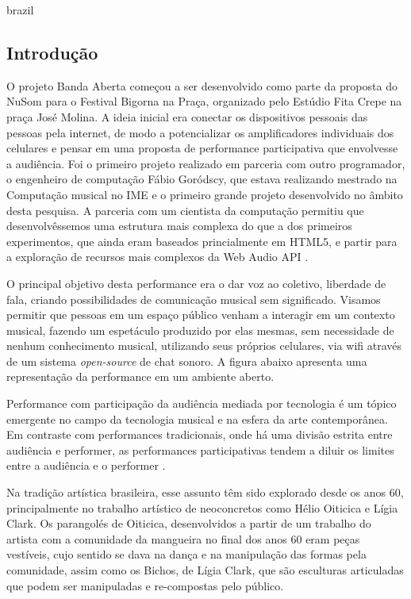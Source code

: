 \begin{otherlanguage*}{brazil}
\subsection{Introdução}
O projeto Banda Aberta começou a ser desenvolvido como parte da proposta do NuSom para o Festival Bigorna na Praça, organizado pelo Estúdio Fita Crepe na praça José Molina. A ideia inicial era conectar os dispositivos pessoais das pessoas pela internet, de modo a potencializar os amplificadores individuais dos celulares e pensar em uma proposta de performance participativa que envolvesse a audiência. Foi o primeiro projeto realizado em parceria com outro programador, o engenheiro de computação Fábio Goródscy, que estava realizando mestrado na Computação musical no IME e o primeiro grande projeto desenvolvido no âmbito desta pesquisa. A parceria com um cientista da computação permitiu que desenvolvêssemos uma estrutura mais complexa do que a dos primeiros experimentos, que ainda eram baseados princialmente em HTML5, e partir para a exploração de recursos mais complexos da Web Audio API \cite{Adenot2015}.

O principal objetivo desta performance era o dar voz ao coletivo, liberdade de fala, criando possibilidades de comunicação musical sem significado. Visamos permitir que pessoas em um espaço público venham a interagir em um contexto musical, fazendo um espetáculo produzido por elas mesmas, sem necessidade de nenhum conhecimento musical, utilizando seus próprios celulares, via wifi através de um sistema \emph{open-source} de chat sonoro. A figura abaixo apresenta uma representação da performance em um ambiente aberto. 

Performance com participação da audiência mediada por tecnologia é um tópico emergente no campo da tecnologia musical \cite{wu2017open} e na esfera da arte contemporânea. Em contraste com performances tradicionais, onde há uma divisão estrita entre audiência e performer, as performances participativas tendem a diluir os limites entre a audiência e o performer \cite{kattwinkel2003audience}. 

Na tradição artística brasileira, esse assunto têm sido explorado desde os anos 60, principalmente no trabalho artístico de neoconcretos como Hélio Oiticica e Lígia Clark. Os parangolés de Oiticica, desenvolvidos a partir de um trabalho do artista com a comunidade da mangueira no final dos anos 60 eram peças vestíveis, cujo sentido se dava na dança e na manipulação das formas pela comunidade, assim como os Bichos, de Lígia Clark, que são esculturas articuladas que podem ser manipuladas e re-compostas pelo público. \cite{Braga2008}


\end{otherlanguage*}
